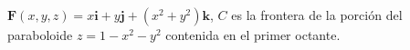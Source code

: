 \item $\mathbf{F}(x, y, z) = x \mathbf{i} + y \mathbf{j} + (x^2 + y^2) \mathbf{k}$, $C$ es la frontera de la porción del paraboloide $z = 1 - x^2 - y^2$ contenida en el primer octante.
